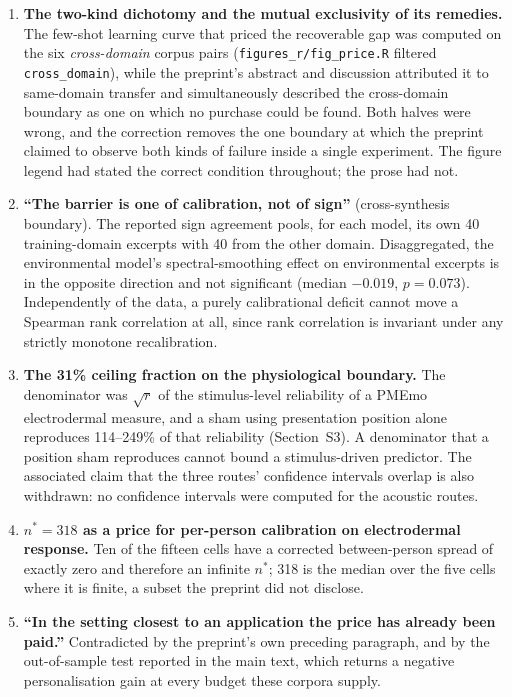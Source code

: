 \begin{enumerate}
\item \textbf{The two-kind dichotomy and the mutual exclusivity of its
remedies.} The few-shot learning curve that priced the recoverable gap was
computed on the six \emph{cross-domain} corpus pairs
(\texttt{figures\_r/fig\_price.R} filtered \texttt{cross\_domain}), while the
preprint's abstract and discussion attributed it to same-domain transfer and
simultaneously described the cross-domain boundary as one on which no purchase
could be found. Both halves were wrong, and the correction removes the one
boundary at which the preprint claimed to observe both kinds of failure inside
a single experiment. The figure legend had stated the correct condition
throughout; the prose had not.

\item \textbf{``The barrier is one of calibration, not of sign''} (cross-synthesis
boundary). The reported sign agreement pools, for each model, its own 40
training-domain excerpts with 40 from the other domain. Disaggregated, the
environmental model's spectral-smoothing effect on environmental excerpts is
in the opposite direction and not significant (median $-0.019$, $p = 0.073$).
Independently of the data, a purely calibrational deficit cannot move a
Spearman rank correlation at all, since rank correlation is invariant under
any strictly monotone recalibration.

\item \textbf{The 31\% ceiling fraction on the physiological boundary.} The
denominator was $\sqrt{r}$ of the stimulus-level reliability of a PMEmo
electrodermal measure, and a sham using presentation position alone reproduces
114--249\% of that reliability (Section~S3). A denominator that a
position sham reproduces cannot bound a stimulus-driven predictor. The
associated claim that the three routes' confidence intervals overlap is also
withdrawn: no confidence intervals were computed for the acoustic routes.

\item \textbf{$n^{*} = 318$ as a price for per-person calibration on
electrodermal response.} Ten of the fifteen cells have a corrected
between-person spread of exactly zero and therefore an infinite $n^{*}$; 318
is the median over the five cells where it is finite, a subset the preprint
did not disclose.

\item \textbf{``In the setting closest to an application the price has already
been paid.''} Contradicted by the preprint's own preceding paragraph, and by
the out-of-sample test reported in the main text, which returns a negative
personalisation gain at every budget these corpora supply.


\end{enumerate}
